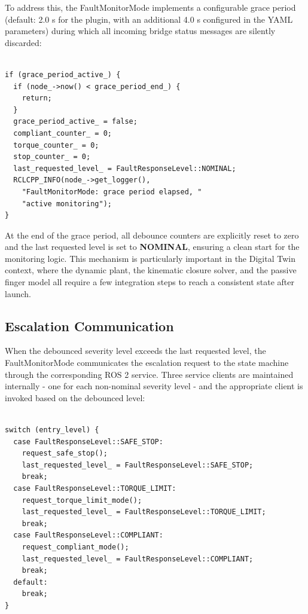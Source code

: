 To address this, the FaultMonitorMode implements a configurable grace period (default: 2.0 s for the plugin, with an additional 4.0 s configured in the YAML parameters) during which all incoming bridge status messages are silently discarded:

\begin{verbatim}

if (grace_period_active_) {
  if (node_->now() < grace_period_end_) {
    return;
  }
  grace_period_active_ = false;
  compliant_counter_ = 0;
  torque_counter_ = 0;
  stop_counter_ = 0;
  last_requested_level_ = FaultResponseLevel::NOMINAL;
  RCLCPP_INFO(node_->get_logger(),
    "FaultMonitorMode: grace period elapsed, "
    "active monitoring");
}

\end{verbatim}

At the end of the grace period, all debounce counters are explicitly reset to zero and the last requested level is set to \textbf{NOMINAL}, ensuring a clean start for the monitoring logic. This mechanism is particularly important in the Digital Twin context, where the dynamic plant, the kinematic closure solver, and the passive finger model all require a few integration steps to reach a consistent state after launch.

\subsection{Escalation Communication}
When the debounced severity level exceeds the last requested level, the FaultMonitorMode communicates the escalation request to the state machine through the corresponding ROS 2 service. Three service clients are maintained internally - one for each non-nominal severity level - and the appropriate client is invoked based on the debounced level:

\begin{verbatim}

switch (entry_level) {
  case FaultResponseLevel::SAFE_STOP:
    request_safe_stop();
    last_requested_level_ = FaultResponseLevel::SAFE_STOP;
    break;
  case FaultResponseLevel::TORQUE_LIMIT:
    request_torque_limit_mode();
    last_requested_level_ = FaultResponseLevel::TORQUE_LIMIT;
    break;
  case FaultResponseLevel::COMPLIANT:
    request_compliant_mode();
    last_requested_level_ = FaultResponseLevel::COMPLIANT;
    break;
  default:
    break;
}

\end{verbatim}

